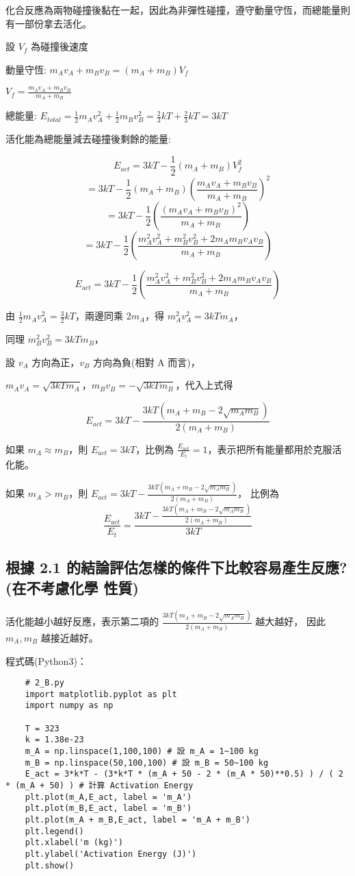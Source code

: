 \documentclass[UTF8,a4paper,12pt]{article}
\begin{document}
化合反應為兩物碰撞後黏在一起，因此為非彈性碰撞，遵守動量守恆，而總能量則有一部份拿去活化。

設 $V_f$ 為碰撞後速度

動量守恆: $m_A v_A + m_B v_B = (m_A+m_B)V_f$

$V_f = \frac{m_A v_A + m_B v_B}{m_A+m_B}$

總能量: $E_{total} = \frac{1}{2} m_A v_A^2 + \frac{1}{2} m_B v_B^2 = \frac{2}{3}kT + \frac{2}{3}kT = 3kT$

活化能為總能量減去碰撞後剩餘的能量: 

$$E_{act} = 3kT - \frac{1}{2} (m_A+m_B)V_f^2$$
$$ = 3kT - \frac{1}{2}(m_A+m_B) {(\frac{m_A v_A + m_B v_B}{m_A+m_B})}^2$$
$$ = 3kT - \frac{1}{2}(\frac{{(m_A v_A + m_B v_B)}^2}{m_A+m_B}) $$
$$ = 3kT - \frac{1}{2}(\frac{m_A^2v_A^2 + m_B^2v_B^2 + 2m_Am_Bv_Av_B}{m_A+m_B}) $$



$$E_{act} = 3kT - \frac{1}{2}(\frac{m_A^2v_A^2 + m_B^2v_B^2 + 2m_Am_Bv_Av_B}{m_A+m_B}) $$

由 $ \frac{1}{2} m_A v_A^2 = \frac{3}{2}kT $，兩邊同乘 $2m_A$，得 $m_A^2 v_A^2 = 3kTm_A$，

同理 $m_B^2 v_B^2 = 3kTm_B$，

設 $v_A$ 方向為正，$v_B$ 方向為負(相對 A 而言)，

$ m_Av_A = \sqrt{3kTm_A} $，$ m_Bv_B = -\sqrt{3kTm_B} $，代入上式得

$$E_{act} = 3kT - \frac{3kT(m_A + m_B - 2\sqrt{m_Am_B})}{2(m_A+m_B)} $$

如果 $m_A ≈ m_B$，則 $E_{act} = 3kT$，比例為 $\frac{E_{act}}{E_t} = 1$，表示把所有能量都用於克服活化能。

如果 $m_A > m_B$，則 $E_{act} = 3kT - \frac{3kT(m_A + m_B - 2\sqrt{m_Am_B})}{2(m_A+m_B)} $，
比例為 $$\frac{E_{act}}{E_t} = \frac{3kT - \frac{3kT(m_A + m_B - 2\sqrt{m_Am_B})}{2(m_A+m_B)}}{3kT}$$

\subsection{根據 2.1 的結論評估怎樣的條件下比較容易產生反應?(在不考慮化學
性質)}

活化能越小越好反應，表示第二項的 $ \frac{3kT(m_A + m_B - 2\sqrt{m_Am_B})}{2(m_A+m_B)} $ 越大越好，
因此 $m_A, m_B$ 越接近越好。

程式碼(Python3)：

\begin{lstlisting}
    # 2_B.py
    import matplotlib.pyplot as plt
    import numpy as np
    
    T = 323
    k = 1.38e-23
    m_A = np.linspace(1,100,100) # 設 m_A = 1~100 kg
    m_B = np.linspace(50,100,100) # 設 m_B = 50~100 kg
    E_act = 3*k*T - (3*k*T * (m_A + 50 - 2 * (m_A * 50)**0.5) ) / ( 2 * (m_A + 50) ) # 計算 Activation Energy
    plt.plot(m_A,E_act, label = 'm_A')
    plt.plot(m_B,E_act, label = 'm_B')
    plt.plot(m_A + m_B,E_act, label = 'm_A + m_B')
    plt.legend()
    plt.xlabel('m (kg)')
    plt.ylabel('Activation Energy (J)')
    plt.show()
\end{lstlisting}
\end{document}
